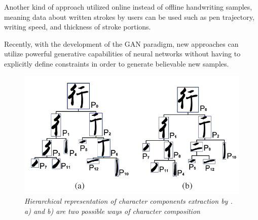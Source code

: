 \documentclass[12pt]{report}
\begin{document}
Another kind of approach utilized online instead of offline handwriting samples, meaning data about written strokes by users can be used such as pen trajectory, writing speed, and thickness of stroke portions.

Recently, with the development of the GAN paradigm, new approaches can utilize powerful generative capabilities of neural networks without having to explicitly define constraints in order to generate believable new samples.

\begin{figure}[h]
	\centering
	\includegraphics[scale=0.7]{hierarch-comp}
	\caption{\textit{Hierarchical representation of character components extraction by \cite{handwritten-font}. a) and b) are two possible ways of character composition}}
	\label{fig:hierarch-comp}
\end{figure}
\end{document}
